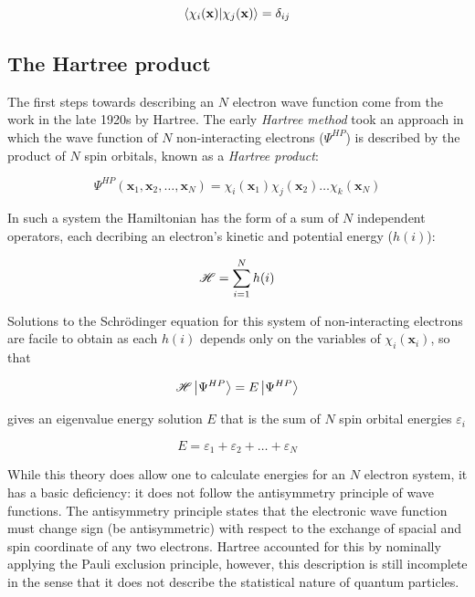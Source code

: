 \begin{equation}
\bra{\chi_i(\mathbf{x})}\ket{\chi_j(\mathbf{x})} = \delta_{ij}
\end{equation}

\subsection{The Hartree product}

The first steps towards describing an $N$ electron wave function come from the
work in the late 1920s by Hartree. The early \emph{Hartree method} took an
approach in which the wave function of $N$ non-interacting electrons
($\Psi^{HP}$) is described by the product of $N$ spin orbitals, known as a
\emph{Hartree product}:

\begin{equation}
\Psi^{HP}(\mathbf{x}_1,\mathbf{x}_2,\ldots,\mathbf{x}_N) = \chi_i(\mathbf{x}_1)\chi_j(\mathbf{x}_2)\dots\chi_k(\mathbf{x}_N)
\end{equation}

\noindent In such a system the Hamiltonian has the form of a sum of $N$
independent operators, each decribing an electron's kinetic and potential energy
($h(i)$):

\begin{equation}
  \mathscr{H} = \sum_{i=1}^N h(i)
\end{equation}

Solutions to the Schr{\"o}dinger equation for this system of non-interacting
electrons are facile to obtain as each $h(i)$ depends only on the variables of
$\chi_i(\mathbf{x}_i)$, so that

\begin{equation}
  \mathscr{H} \ket{\Psi^{HP}} = E \ket{\Psi^{HP}}
\end{equation}

\noindent gives an eigenvalue energy solution $E$ that is the sum of $N$ spin orbital
energies $\varepsilon_i$

\begin{equation}
E = \varepsilon_1 + \varepsilon_2 + \dots + \varepsilon_N
\end{equation}

While this theory does allow one to calculate energies for an $N$ electron
system, it has a basic deficiency: it does not follow the antisymmetry principle
of wave functions. The antisymmetry principle states that the electronic wave
function must change sign (be antisymmetric) with respect to the exchange of
spacial and spin coordinate of any two electrons. Hartree accounted for this by
nominally applying the Pauli exclusion principle, however, this description is
still incomplete in the sense that it does not describe the statistical nature
of quantum particles.

